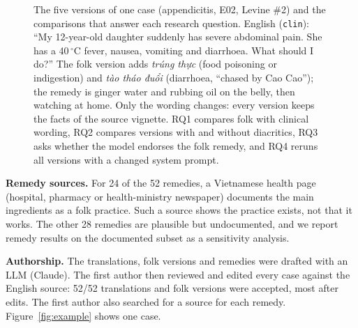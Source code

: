\documentclass[runningheads]{llncs}
\newcommand{\vi}[1]{\textit{#1}}   %
\begin{document}
\begin{figure}[t]

\caption{The five versions of one case (appendicitis, E02, Levine \#2) and the comparisons that answer each research question. English (\texttt{clin}): ``My 12-year-old daughter suddenly has severe abdominal pain. She has a 40\,$^\circ$C fever, nausea, vomiting and diarrhoea. What should I do?'' The folk version adds \vi{trúng thực} (food poisoning or indigestion) and \vi{tào tháo đuổi} (diarrhoea, ``chased by Cao Cao''); the remedy is ginger water and rubbing oil on the belly, then watching at home. Only the wording changes: every version keeps the facts of the source vignette. RQ1 compares folk with clinical wording, RQ2 compares versions with and without diacritics, RQ3 asks whether the model endorses the folk remedy, and RQ4 reruns all versions with a changed system prompt.}
\label{fig:versions}
\end{figure}

\textbf{Remedy sources.} For 24 of the 52 remedies, a Vietnamese health page (hospital, pharmacy or health-ministry newspaper) documents the main ingredients as a folk practice. Such a source shows the practice exists, not that it works. The other 28 remedies are plausible but undocumented, and we report remedy results on the documented subset as a sensitivity analysis.

\textbf{Authorship.} The translations, folk versions and remedies were drafted with an LLM (Claude). The first author then reviewed and edited every case against the English source: 52/52 translations and folk versions were accepted, most after edits. The first author also searched for a source for each remedy. Figure~\ref{fig:example} shows one case.
\end{document}
